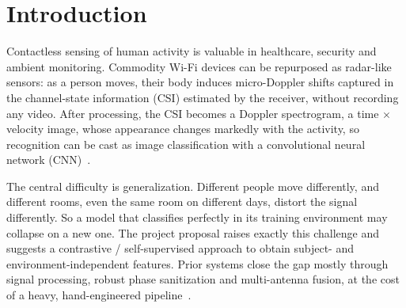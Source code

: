
\section{Introduction}
\label{sec:introduction}

Contactless sensing of human activity is valuable in healthcare, security and
ambient monitoring. Commodity Wi-Fi devices can be repurposed as radar-like
sensors: as a person moves, their body induces micro-Doppler shifts captured in
the channel-state information (CSI) estimated by the receiver, without
recording any video. After processing, the CSI becomes a Doppler
spectrogram, a time$\,\times\,$velocity image, whose appearance changes
markedly with the activity, so recognition can be cast as image classification
with a convolutional neural network (CNN)~\cite{sharp}.

The central difficulty is generalization. Different people move
differently, and different rooms, even the same room on different days, distort
the signal differently. So a model that classifies perfectly in its training
environment may collapse on a new one. The project proposal raises exactly this
challenge and suggests a contrastive / self-supervised approach to obtain
subject- and environment-independent features. Prior systems close the gap mostly
through signal processing, robust phase sanitization and multi-antenna
fusion, at the cost of a heavy, hand-engineered pipeline~\cite{sharp}.

